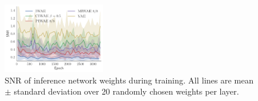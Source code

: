  


\begin{figure}[t!]
	\centering
	\includegraphics[width=0.395\textwidth]{figures/tighter_bounds/snr_encoder}
	\caption{\gls{SNR} of inference network weights during training. All lines are mean $\pm$ standard deviation over 20 randomly chosen weights per layer.
		\vspace{-12pt} \label{fig:inferencesnr}}
\end{figure}

